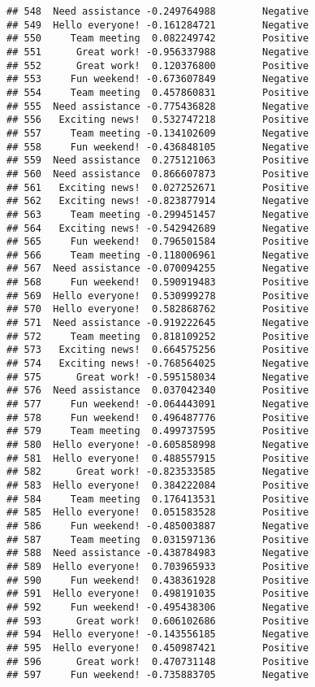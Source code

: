 \documentclass[
]{article}
\begin{document}
\begin{verbatim}
## 548  Need assistance -0.249764988        Negative
## 549  Hello everyone! -0.161284721        Negative
## 550     Team meeting  0.082249742        Positive
## 551      Great work! -0.956337988        Negative
## 552      Great work!  0.120376800        Positive
## 553     Fun weekend! -0.673607849        Negative
## 554     Team meeting  0.457860831        Positive
## 555  Need assistance -0.775436828        Negative
## 556   Exciting news!  0.532747218        Positive
## 557     Team meeting -0.134102609        Negative
## 558     Fun weekend! -0.436848105        Negative
## 559  Need assistance  0.275121063        Positive
## 560  Need assistance  0.866607873        Positive
## 561   Exciting news!  0.027252671        Positive
## 562   Exciting news! -0.823877914        Negative
## 563     Team meeting -0.299451457        Negative
## 564   Exciting news! -0.542942689        Negative
## 565     Fun weekend!  0.796501584        Positive
## 566     Team meeting -0.118006961        Negative
## 567  Need assistance -0.070094255        Negative
## 568     Fun weekend!  0.590919483        Positive
## 569  Hello everyone!  0.530999278        Positive
## 570  Hello everyone!  0.582868762        Positive
## 571  Need assistance -0.919222645        Negative
## 572     Team meeting  0.818109252        Positive
## 573   Exciting news!  0.664575256        Positive
## 574   Exciting news! -0.768564025        Negative
## 575      Great work! -0.595158034        Negative
## 576  Need assistance  0.037042340        Positive
## 577     Fun weekend! -0.064443091        Negative
## 578     Fun weekend!  0.496487776        Positive
## 579     Team meeting  0.499737595        Positive
## 580  Hello everyone! -0.605858998        Negative
## 581  Hello everyone!  0.488557915        Positive
## 582      Great work! -0.823533585        Negative
## 583  Hello everyone!  0.384222084        Positive
## 584     Team meeting  0.176413531        Positive
## 585  Hello everyone!  0.051583528        Positive
## 586     Fun weekend! -0.485003887        Negative
## 587     Team meeting  0.031597136        Positive
## 588  Need assistance -0.438784983        Negative
## 589  Hello everyone!  0.703965933        Positive
## 590     Fun weekend!  0.438361928        Positive
## 591  Hello everyone!  0.498191035        Positive
## 592     Fun weekend! -0.495438306        Negative
## 593      Great work!  0.606102686        Positive
## 594  Hello everyone! -0.143556185        Negative
## 595  Hello everyone!  0.450987421        Positive
## 596      Great work!  0.470731148        Positive
## 597     Fun weekend! -0.735883705        Negative

\end{verbatim}
\end{document}
